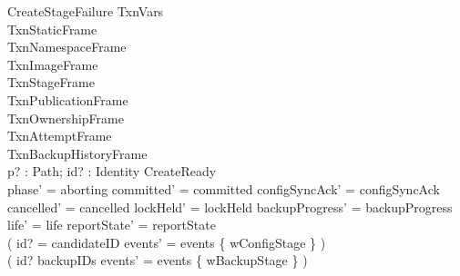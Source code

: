 \documentclass{article}
\begin{document}
\begin{schema}{CreateStageFailure}
	\Delta TxnVars \\
	TxnStaticFrame \\
	TxnNamespaceFrame \\
	TxnImageFrame \\
	TxnStageFrame \\
	TxnPublicationFrame \\
	TxnOwnershipFrame \\
	TxnAttemptFrame \\
	TxnBackupHistoryFrame \\
	p? : Path; id? : Identity
	\where
	CreateReady \\
	phase' = aborting \land committed' = committed \land
	configSyncAck' = configSyncAck \land cancelled' = cancelled \land
	lockHeld' = lockHeld \land backupProgress' = backupProgress \land
	life' = life \land reportState' = reportState \\
	( id? = candidateID \implies events' = events \cup \{ wConfigStage \} ) \\
	( id? \in backupIDs \implies events' = events \cup \{ wBackupStage \} )
\end{schema}
\end{document}
